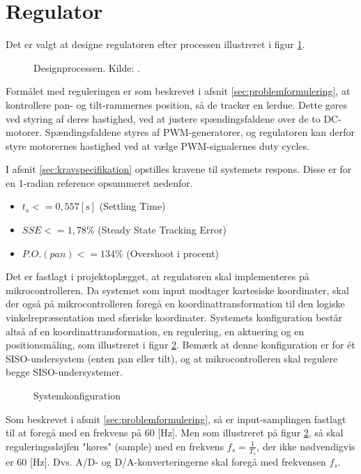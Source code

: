 \section{Regulator}
\label{sec:kontrollerdeign}
Det er valgt at designe regulatoren efter processen illustreret i figur \ref{fig:designproces}.
\begin{figure}[!th]
\centering

\caption[Designprocessen]{Designprocessen. Kilde: \cite{reg_modern_control_systems}.}
\label{fig:designproces}
\end{figure}
Formålet med reguleringen er som beskrevet i afsnit \ref{sec:problemformulering},
at kontrollere pan- og tilt-rammernes position, så de tracker en lerdue.
Dette gøres ved styring af deres hastighed, ved at justere spændingsfaldene over de
to DC-motorer. Spændingsfaldene styres af PWM-generatorer, og regulatoren
kan derfor styre motorernes hastighed ved at vælge PWM-signalernes duty cycles.

I afsnit \ref{sec:kravspecifikation} opstilles kravene til systemets respons.
Disse er for en 1-radian reference opsummeret nedenfor.
\begin{itemize}
\item \(t_{s} <= 0,557 \mathrm{\left[s\right]}\) (Settling Time)
\item \(SSE <= 1,78 \%\) (Steady State Tracking Error)
\item \(P.O. (pan) <= 134 \%\) (Overshoot i procent)
\end{itemize}

Det er fastlagt i projektoplægget, at regulatoren skal implementeres på mikrocontrolleren.
Da systemet som input modtager kartesiske koordinater,
skal der også på mikrocontrolleren foregå en koordinattransformation
til den logiske vinkelrepræsentation med sfæriske koordinater.
Systemets konfiguration består altså af en koordinattransformation,
en regulering, en aktuering og en positionsmåling, som illustreret
i figur \ref{fig:digitalkontroller1}.
Bemærk at denne konfiguration er for ét SISO-undersystem (enten pan eller tilt),
og at mikrocontrolleren skal regulere begge SISO-undersystemer.
\begin{figure}[!th]
\centering
\begin{tikzpicture}[auto, node distance=2.6cm,>=latex']

\end{tikzpicture}
\caption[Systemkonfiguration]{Systemkonfiguration}
\label{fig:digitalkontroller1}
\end{figure}
Som beskrevet i afsnit \ref{sec:problemformulering},
så er input-samplingen fastlagt til at foregå med en frekvens på 60 [Hz].
Men som illustreret på figur \ref{fig:digitalkontroller1}, så skal reguleringssløjfen
"køres" (sample) med en frekvens \(f_s=\frac{1}{T_s}\), der ikke nødvendigvis er 60 [Hz].
Dvs. A/D- og D/A-konverteringerne skal foregå med frekvensen \(f_s\).

